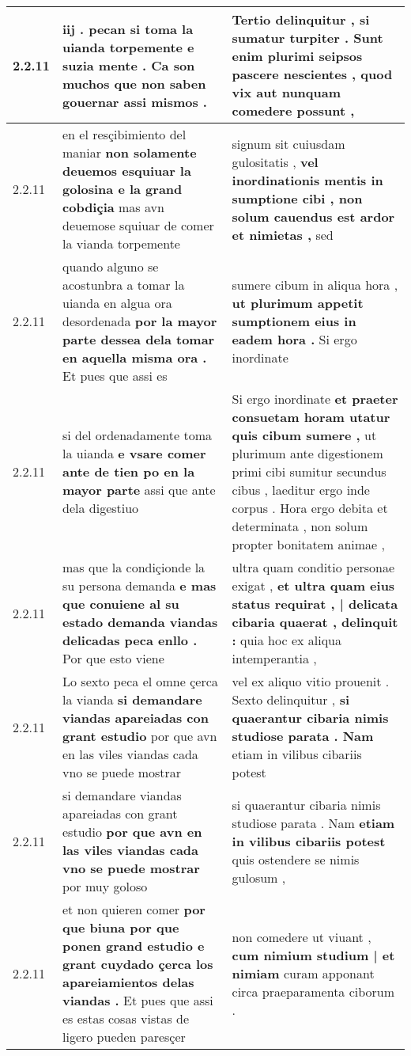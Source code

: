 \begin{tabular}{|p{1cm}|p{6.5cm}|p{6.5cm}|}
2.2.11 & iij . pecan si toma la uianda torpemente \textbf{ e suzia mente . } Ca son muchos que non saben gouernar assi mismos . & Tertio delinquitur , \textbf{ si sumatur turpiter . Sunt enim plurimi seipsos pascere nescientes , } quod vix aut nunquam comedere possunt , \\\hline
2.2.11 & en el resçibimiento del maniar \textbf{ non solamente deuemos esquiuar la golosina e la grand cobdiçia } mas avn deuemose squiuar de comer la vianda torpemente & signum sit cuiusdam gulositatis , \textbf{ vel inordinationis mentis in sumptione cibi , non solum cauendus est ardor et nimietas , } sed \\\hline
2.2.11 & quando alguno se acostunbra a tomar la uianda en algua ora desordenada \textbf{ por la mayor parte dessea dela tomar en aquella misma ora . } Et pues que assi es & sumere cibum in aliqua hora , \textbf{ ut plurimum appetit sumptionem eius in eadem hora . } Si ergo inordinate \\\hline
2.2.11 & si del ordenadamente toma la uianda \textbf{ e vsare comer ante de tien po en la mayor parte } assi que ante dela digestiuo & Si ergo inordinate \textbf{ et praeter consuetam horam utatur quis cibum sumere , } ut plurimum ante digestionem primi cibi sumitur secundus cibus , laeditur ergo inde corpus . Hora ergo debita et determinata , non solum propter bonitatem animae , \\\hline
2.2.11 & mas que la condiçionde la su persona demanda \textbf{ e mas que conuiene al su estado demanda viandas delicadas peca enllo . } Por que esto viene & ultra quam conditio personae exigat , \textbf{ et ultra quam eius status requirat , | delicata cibaria quaerat , delinquit : } quia hoc ex aliqua intemperantia , \\\hline
2.2.11 & Lo sexto peca el omne çerca la vianda \textbf{ si demandare viandas apareiadas con grant estudio } por que avn en las viles viandas cada vno se puede mostrar & vel ex aliquo vitio prouenit . Sexto delinquitur , \textbf{ si quaerantur cibaria nimis studiose parata . Nam } etiam in vilibus cibariis potest \\\hline
2.2.11 & si demandare viandas apareiadas con grant estudio \textbf{ por que avn en las viles viandas cada vno se puede mostrar } por muy goloso & si quaerantur cibaria nimis studiose parata . Nam \textbf{ etiam in vilibus cibariis potest } quis ostendere se nimis gulosum , \\\hline
2.2.11 & et non quieren comer \textbf{ por que biuna por que ponen grand estudio e grant cuydado çerca los apareiamientos delas viandas . } Et pues que assi es estas cosas vistas de ligero pueden paresçer & non comedere ut viuant , \textbf{ cum nimium studium | et nimiam } curam apponant circa praeparamenta ciborum . \\\hline

\end{tabular}
